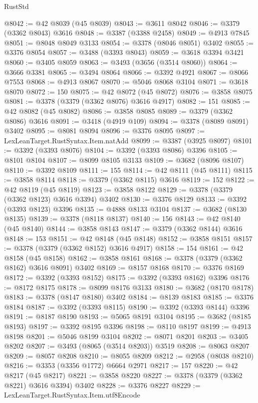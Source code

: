 \begin{lexlean}{RustStd}
\begin{coremodule}
@8042 := @42 @8039 (@45 @8039)
@8043 := @3611 @8042
@8046 := @3379 (@3362 @8043) @3616
@8048 := @3387 (@3388 @2458)
@8049 := @4913 @7845
@8051 := @8048 @8049 @3133
@8054 := @3378 (@8046 @8051) @3402
@8055 := @3376 @8054
@8057 := @3488 (@3393 @8043)
@8059 := @3618 @3394 @3421
@8060 := @3405 @8059
@8063 := @3493 (@3656 (@3514 @8060))
@8064 := @3666 @3381
@8065 := @3494 @8064
@8066 := @3392 @4921
@8067 := @8066 @7553
@8068 := @4913 @8067
@8070 := @5046 @8068 @3104
@8071 := @3618 @8070
@8072 := 150
@8075 := @42 @8072 (@45 @8072)
@8076 := @3858 @8075
@8081 := @3378 (@3379 (@3362 @8076) @3616 @4917)
@8082 := 151
@8085 := @42 @8082 (@45 @8082)
@8086 := @3858 @8085
@8089 := @3379 (@3362 @8086) @3616
@8091 := @3418 (@4919 @109)
@8094 := @3378 (@8089 @8091) @3402
@8095 := @8081 @8094
@8096 := @3376 @8095
@8097 := LexLeanTarget.RustSyntax.Item.natAdd
@8099 := @3387 (@3925 @8097)
@8101 := @3392 (@3393 @8076)
@8104 := @3392 (@3393 @8086) @3396
@8105 := @8101 @8104
@8107 := @8099 @8105 @3133
@8109 := @3682 (@8096 @8107)
@8110 := @3392 @8109
@8111 := 155
@8114 := @42 @8111 (@45 @8111)
@8115 := @3858 @8114
@8118 := @3379 (@3362 @8115) @3616
@8119 := 152
@8122 := @42 @8119 (@45 @8119)
@8123 := @3858 @8122
@8129 := @3378 (@3379 (@3362 @8123) @3616 @3394) @3402
@8130 := @3376 @8129
@8133 := @3392 (@3393 @8123) @3396
@8135 := @4888 @8133 @3104
@8137 := @3682 (@8130 @8135)
@8139 := @3378 (@8118 @8137)
@8140 := 156
@8143 := @42 @8140 (@45 @8140)
@8144 := @3858 @8143
@8147 := @3379 (@3362 @8144) @3616
@8148 := 153
@8151 := @42 @8148 (@45 @8148)
@8152 := @3858 @8151
@8157 := @3378 (@3379 (@3362 @8152) @3616 @4917)
@8158 := 154
@8161 := @42 @8158 (@45 @8158)
@8162 := @3858 @8161
@8168 := @3378 (@3379 (@3362 @8162) @3616 @8091) @3402
@8169 := @8157 @8168
@8170 := @3376 @8169
@8172 := @3392 (@3393 @8152)
@8175 := @3392 (@3393 @8162) @3396
@8176 := @8172 @8175
@8178 := @8099 @8176 @3133
@8180 := @3682 (@8170 @8178)
@8183 := @3378 (@8147 @8180) @3402
@8184 := @8139 @8183
@8185 := @3376 @8184
@8187 := @3392 (@3393 @8115)
@8190 := @3392 (@3393 @8144) @3396
@8191 := @8187 @8190
@8193 := @5065 @8191 @3104
@8195 := @3682 (@8185 @8193)
@8197 := @3392 @8195 @3396
@8198 := @8110 @8197
@8199 := @4913 @8198
@8201 := @5046 @8199 @3104
@8202 := @8071 @8201
@8203 := @3405 @8202
@8207 := @3493 (@8065 (@3514 @8203)) @3519
@8208 := @8063 @8207
@8209 := @8057 @8208
@8210 := @8055 @8209
@8212 := @2958 (@8038 @8210)
@8216 := @3353 (@3356 @1772) @6664 @2971
@8217 := 157
@8220 := @42 @8217 (@45 @8217)
@8221 := @3858 @8220
@8227 := @3378 (@3379 (@3362 @8221) @3616 @3394) @3402
@8228 := @3376 @8227
@8229 := LexLeanTarget.RustSyntax.Item.utf8Encode

\end{coremodule}
\end{lexlean}
